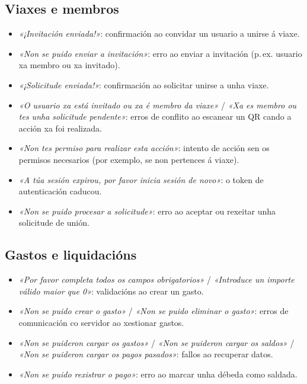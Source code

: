 \subsection*{Viaxes e membros}
\begin{itemize}
  \item \textit{«¡Invitación enviada!»}: confirmación ao convidar un usuario a unirse á
        viaxe.
  \item \textit{«Non se puido enviar a invitación»}: erro ao enviar a invitación (p.\,ex.
        usuario xa membro ou xa invitado).
  \item \textit{«¡Solicitude enviada!»}: confirmación ao solicitar unirse a unha viaxe.
  \item \textit{«O usuario xa está invitado ou xa é membro da viaxe»} /
        \textit{«Xa es membro ou tes unha solicitude pendente»}: erros de conflito ao
        escanear un QR cando a acción xa foi realizada.
  \item \textit{«Non tes permiso para realizar esta acción»}: intento de acción sen os
        permisos necesarios (por exemplo, se non pertences á viaxe).
  \item \textit{«A túa sesión expirou, por favor inicia sesión de novo»}: o token de
        autenticación caducou.
  \item \textit{«Non se puido procesar a solicitude»}: erro ao aceptar ou rexeitar unha
        solicitude de unión.
\end{itemize}

\subsection*{Gastos e liquidacións}
\begin{itemize}
  \item \textit{«Por favor completa todos os campos obrigatorios»} /
        \textit{«Introduce un importe válido maior que 0»}: validacións ao crear un gasto.
  \item \textit{«Non se puido crear o gasto»} / \textit{«Non se puido eliminar o gasto»}:
        erros de comunicación co servidor ao xestionar gastos.
  \item \textit{«Non se puideron cargar os gastos»} /
        \textit{«Non se puideron cargar os saldos»} /
        \textit{«Non se puideron cargar os pagos pasados»}: fallos ao recuperar datos.
  \item \textit{«Non se puido rexistrar o pago»}: erro ao marcar unha débeda como saldada.
\end{itemize}

